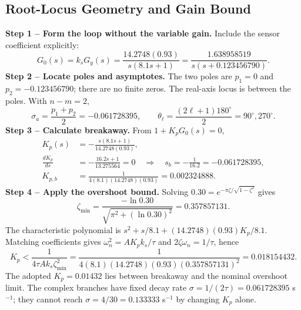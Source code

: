 \subsection{Root-Locus Geometry and Gain Bound}
\textbf{Step 1 -- Form the loop without the variable gain.} Include the sensor coefficient explicitly:
\begin{equation}
G_0(s)=k_sG_y(s)=\frac{14.2748(0.93)}{s(8.1s+1)}
=\frac{1.638958519}{s(s+0.123456790)}.
\end{equation}
\textbf{Step 2 -- Locate poles and asymptotes.} The two poles are $p_1=0$ and $p_2=-0.123456790$; there are no finite zeros. The real-axis locus is between the poles. With $n-m=2$,
\begin{equation}
\sigma_a=\frac{p_1+p_2}{2}=-0.061728395,\qquad
\theta_\ell=\frac{(2\ell+1)180^\circ}{2}=90^\circ,270^\circ.
\end{equation}
\textbf{Step 3 -- Calculate breakaway.} From $1+K_pG_0(s)=0$,
\begin{align}
K_p(s)&=-\frac{s(8.1s+1)}{14.2748(0.93)},\\
\frac{dK_p}{ds}&=-\frac{16.2s+1}{13.275564}=0
\quad\Rightarrow\quad s_b=-\frac1{16.2}=-0.061728395,\\
K_{p,b}&=\frac1{4(8.1)(14.2748)(0.93)}=0.002324888.
\end{align}
\textbf{Step 4 -- Apply the overshoot bound.} Solving $0.30=e^{-\pi\zeta/\sqrt{1-\zeta^2}}$ gives
\begin{equation}
\zeta_{\min}=\frac{-\ln0.30}{\sqrt{\pi^2+(\ln0.30)^2}}=0.357857131.
\end{equation}
The characteristic polynomial is $s^2+s/8.1+(14.2748)(0.93)K_p/8.1$. Matching coefficients gives $\omega_n^2=AK_pk_s/\tau$ and $2\zeta\omega_n=1/\tau$, hence
\begin{equation}
K_p<\frac1{4\tau Ak_s\zeta_{\min}^2}
=\frac1{4(8.1)(14.2748)(0.93)(0.357857131)^2}=0.018154432.
\end{equation}
The adopted $K_p=0.01432$ lies between breakaway and the nominal overshoot limit. The complex branches have fixed decay rate $\sigma=1/(2\tau)=0.061728395$ s$^{-1}$; they cannot reach $\sigma=4/30=0.133333$ s$^{-1}$ by changing $K_p$ alone.
\page
